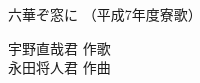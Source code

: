 \documentclass[10pt,b5j]{tarticle} %
\begin{document}
\begin{minipage}[c]{0.7\hsize} %
    \begin{center}
        {\LARGE
            六華ぞ窓に %
        }
        {\small 
            （平成7年度寮歌） %
        }
    \end{center}
\end{minipage}
\begin{minipage}[c]{0.3\hsize} %
    \begin{flushright} %
        宇野直哉君 作歌\\永田将人君 作曲 %
    \end{flushright}
\end{minipage}
\end{document}
